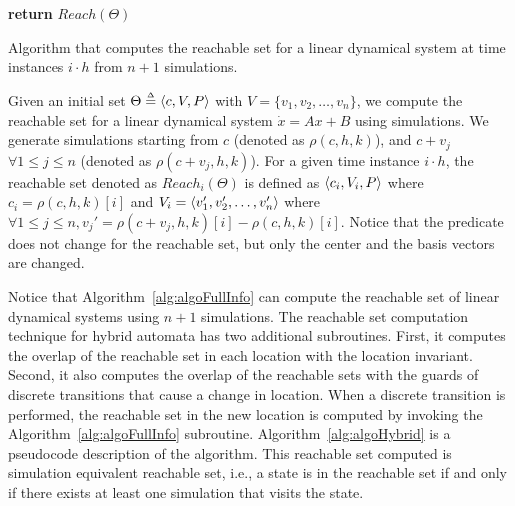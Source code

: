 \vspace{-0.7cm}
\begin{algorithm}[h]
{\bf return} $Reach(\Theta)$\;
\caption{Algorithm that computes the reachable set for a linear dynamical system at time instances $i \cdot h$ from $n+1$ simulations.}
\label{alg:algoFullInfo}
\end{algorithm}
\vspace{-0.7cm}

Given an initial set $\Theta \deq \tup{c, V, P}$ with $V = \{v_1, v_2, \ldots, v_n\}$, we compute the reachable set for a linear dynamical system $\dot{x} = Ax + B$ using simulations.
%
We generate simulations starting from $c$ (denoted as $\rho(c, h, k)$), and $c+v_j$ $\forall 1\leq j \leq n$ (denoted as $\rho(c+v_j, h, k)$). 
%
For a given time instance $i\cdot h$, the reachable set denoted as $Reach_i(\Theta)$ is defined as $\tup{c_i, V_i, P}$ where $c_i = \rho(c, h, k)[i]$ and $V_i = \tup{v_1', v_2', \ldots, v_n'}$ where $\forall 1\leq j \leq n, v_j' = \rho(c+v_j, h, k)[i] - \rho(c, h, k)[i]$. 
%
Notice that the predicate does not change for the reachable set, but only the center and the basis vectors are changed.
%

Notice that Algorithm~\ref{alg:algoFullInfo} can compute the reachable set of linear dynamical systems using $n+1$ simulations. 
%
The reachable set computation technique for hybrid automata has two additional subroutines.
%
First, it computes the overlap of the reachable set in each location with the location invariant.
%
Second, it also computes the overlap of the reachable sets with the guards of discrete transitions that cause a change in location.
%
When a discrete transition is performed, the reachable set in the new location is computed by invoking the Algorithm~\ref{alg:algoFullInfo} subroutine.
%
Algorithm~\ref{alg:algoHybrid} is a pseudocode description of the algorithm. This reachable set computed is simulation equivalent reachable set, i.e., a state is in the reachable set if and only if there exists at least one simulation that visits the state.

